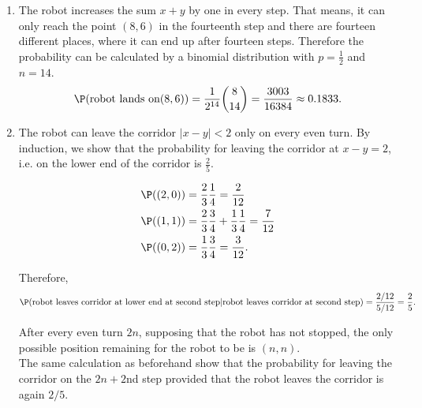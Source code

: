 \begin{solution}

\phantom{}

\begin{enumerate}[label = (\alph*)]
  \item The robot increases the sum $x + y$ by one in every step. That means, it can only
  reach the point $(8,6)$ in the fourteenth step and there are fourteen different places,
  where it can end up after fourteen steps.
  Therefore the probability can be calculated by a binomial distribution
  with $p = \frac{1}{2}$ and $n = 14$.
  \begin{align*}
    \P(\text{robot lands on} (8,6)) = \frac{1}{2^{14}}\binom{8}{14} = \frac{3003}{16384} \approx 0.1833.
  \end{align*}
  \item The robot can leave the corridor $|x - y| < 2$ only on every even turn.
  By induction, we show that the probability for leaving the corridor at $x - y = 2$,
  i.e. on the lower end of the corridor is $\frac{2}{5}$.

  \begin{align*}
    \P((2,0)) &= \frac{2}{3}\frac{1}{4} = \frac{2}{12} \\
    \P((1,1)) &= \frac{2}{3}\frac{3}{4} + \frac{1}{3}\frac{1}{4} = \frac{7}{12} \\
    \P((0,2)) &= \frac{1}{3}\frac{3}{4} = \frac{3}{12}.
  \end{align*}

  Therefore,
  \begin{align*}
    \P(\text{robot leaves corridor at lower end at second step}|
    \text{robot leaves corridor at second step})
    = \frac{2/12}{5/12} = \frac{2}{5}.
  \end{align*}

  After every even turn $2n$, supposing that the robot has not stopped, the only
  possible position remaining for the robot to be is $(n,n)$. \\

  The same calculation as beforehand show that the probability for leaving the corridor
  on the $2n + 2$nd step provided that the robot leaves the corridor is again $2/5$.
\end{enumerate}



\end{solution}

